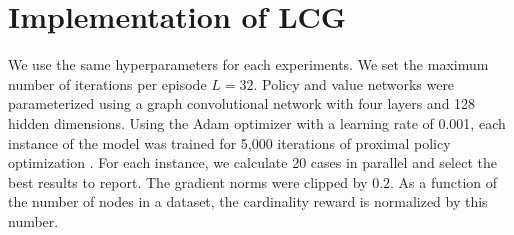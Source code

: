 \documentclass[a4paper,journal]{IEEEtran}
\begin{document}
\begin{table}[htbp]
\centering
\caption{Specific parameters for generating graph in Table \ref{Generalization}.}
\label{Table_2_parameter}
\end{table}

\section{Implementation of LCG}\label{Implementation_of_L2C}
We use the same hyperparameters for each experiments. We set the maximum number of iterations per episode $L = 32$. Policy and value networks were parameterized using a graph convolutional network with four layers and 128 hidden dimensions. Using the Adam optimizer with a learning rate of 0.001, each instance of the model was trained for 5,000 iterations of proximal policy optimization \cite{ppo}. For each instance, we calculate 20 cases in parallel and select the best results to report. The gradient norms were clipped by $0.2$. As a function of the number of nodes in a dataset, the cardinality reward is normalized by this number. 




 
\end{document}
